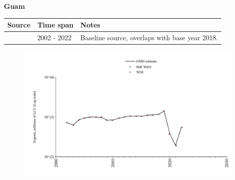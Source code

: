 \documentclass[12pt,a4paper,landscape]{article}
\begin{document}
\begin{adjustbox}{max totalsize={\paperwidth}{\paperheight},center}
\begin{minipage}[t][\textheight][t]{\textwidth}
\vspace*{0.5cm}
{}
\begin{center}
{\Large\bfseries Guam}
\end{center}
\vspace{0.5cm}
\begin{table}[H]
\centering
\small
\begin{tabular}{|l|l|l|}
\hline
\textbf{Source} & \textbf{Time span} & \textbf{Notes} \\
\hline
\rowcolor{white}\cite{WDI}& 2002 - 2022 &Baseline source, overlaps with base year 2018.\\
\hline
\end{tabular}
\end{table}
\begin{figure}[H]
\centering
\includegraphics[width=\textwidth,height=0.6\textheight,keepaspectratio]{graphs/GUM_exports.pdf}
\end{figure}
\end{minipage}
\end{adjustbox}
\end{document}
